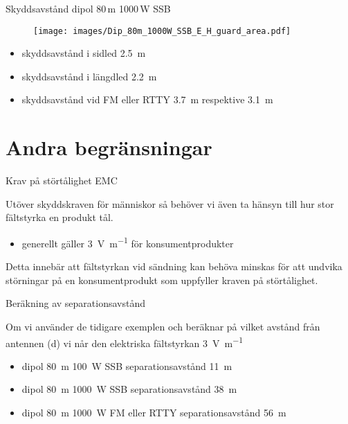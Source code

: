 \documentclass{beamer}
\begin{document}
\begin{frame}{Skyddsavstånd dipol 80\,m 1000\,W SSB}

\begin{figure}[h]
	\texttt{[image: images/Dip\_80m\_1000W\_SSB\_E\_H\_guard\_area.pdf]}
\end{figure}

\begin{itemize}
	\item skyddsavstånd i sidled \qty{2,5}{\meter}
	\item skyddsavstånd i längdled \qty{2,2}{\meter}
	\item skyddsavstånd vid FM eller RTTY \qty{3,7}{\meter} respektive \qty{3,1}{\meter}
\end{itemize}
\end{frame}

\section{Andra begränsningar}

\begin{frame}{Krav på störtålighet EMC}

Utöver skyddskraven för människor så behöver vi även ta hänsyn till hur stor
fältstyrka en produkt tål.
\begin{itemize}
	\item generellt gäller \qty{3}{\volt\per\meter} för konsumentprodukter
\end{itemize}
Detta innebär att fältstyrkan vid sändning kan behöva minskas för att undvika
störningar på en konsumentprodukt som uppfyller kraven på störtålighet.
\end{frame}

\begin{frame}{Beräkning av separationsavstånd}

Om vi använder de tidigare exemplen och beräknar på vilket avstånd från antennen
(d) vi når den elektriska fältstyrkan \qty{3}{\volt\per\meter}
\begin{itemize}
	\item dipol \qty{80}{\meter} \qty{100}{\watt} SSB separationsavstånd \qty{11}{\meter}
	\item dipol \qty{80}{\meter} \qty{1000}{\watt} SSB separationsavstånd \qty{38}{\meter}
	\item dipol \qty{80}{\meter} \qty{1000}{\watt} FM eller RTTY separationsavstånd \qty{56}{\meter}
\end{itemize}
\end{frame}
\end{document}
